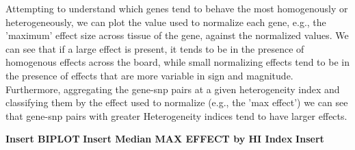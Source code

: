 Attempting to understand which genes tend to behave the most homogenously or heterogeneously, we can plot the value used to normalize each gene, e.g., the 'maximum' effect size across tissue of the gene, against the normalized values. We can see that if a large effect is present, it tends to be in the presence of homogenous effects across the board, while small normalizing effects tend to be in the presence of effects that are more variable in sign and magnitude. Furthermore, aggregating the gene-snp pairs at a given heterogeneity index and classifying them by the effect used to normalize (e.g., the 'max effect') we can see that gene-snp pairs with greater Heterogeneity indices tend to have larger effects.

\textbf{Insert BIPLOT}
\textbf{Insert Median MAX EFFECT by HI Index}
\textbf{Insert }




